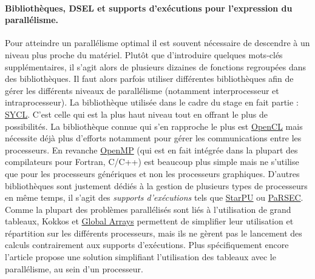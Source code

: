 \paragraph{Bibliothèques, DSEL et supports d'exécutions pour l'expression du parallélisme.}
Pour atteindre un parallélisme optimal il est souvent nécessaire de descendre à un niveau plus proche du matériel. Plutôt que d'introduire quelques mots-clés supplémentaires, il s'agit alors de plusieurs dizaines de fonctions regroupées dans des bibliothèques. Il faut alors parfois utiliser différentes bibliothèques afin de gérer les différents niveaux de parallélisme (notamment interprocesseur et intraprocesseur). La bibliothèque utilisée dans le cadre du stage en fait partie : \textsf{\href{https://www.khronos.org/sycl}{SYCL}}. C'est celle qui est la plus haut niveau tout en offrant le plus de possibilités. La bibliothèque connue qui s'en rapproche le plus est \textsf{\href{https://www.khronos.org/opencl/}{OpenCL}} mais nécessite déjà plus d'efforts notamment pour gérer les communications entre les processeurs. En revanche \textsf{\href{http://openmp.org/wp/}{OpenMP}} (qui est en fait intégrée dans la plupart des compilateurs pour \textsf{Fortran}, \textsf{C/C++}) est beaucoup plus simple mais ne s'utilise que pour les processeurs génériques et non les processeurs graphiques. D'autres bibliothèques sont justement dédiés à la gestion de plusieurs types de processeurs en même temps, il s'agit des \emph{supports d'exécutions} tels que \textsf{\href{http://starpu.gforge.inria.fr/}{StarPU}} ou \textsf{\href{http://icl.utk.edu/parsec/}{PaRSEC}}. Comme la plupart des problèmes parallélisés sont liés à l'utilisation de grand tableaux, \textsf{Kokkos} \cite{Web5} et \textsf{\href{http://hpc.pnl.gov/globalarrays/}{Global Arrays}} permettent de simplifier leur utilisation et répartition sur les différents processeurs, mais ils ne gèrent pas le lancement des calculs contrairement aux supports d'exécutions. Plus spécifiquement encore l'article \cite{Art2} propose une solution simplifiant l'utilisation des tableaux avec le parallélisme, au sein d'un processeur. 



